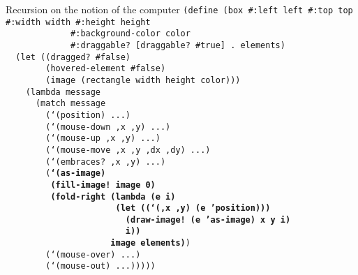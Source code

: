 \begin{frame}{Recursion on the notion of the computer}
  \tiny
  \texttt{(define (box \#:left left \#:top top \#:width width \#:height height\\
    \ \ \ \ \ \ \ \ \ \ \ \ \ \#:background-color color\\
    \ \ \ \ \ \ \ \ \ \ \ \ \ \#:draggable? [draggable? \#true] . elements)\\
    \ \ (let ((dragged? \#false)\\
    \ \ \ \ \ \ \ \ (hovered-element \#false)\\
    \ \ \ \ \ \ \ \ (image (rectangle width height color)))\\
    \ \ \ \ (lambda message\\
    \ \ \ \ \ \ (match message\\
    \ \ \ \ \ \ \ \ (`(position) ...)\\
    \ \ \ \ \ \ \ \ (`(mouse-down ,x ,y) ...)\\
    \ \ \ \ \ \ \ \ (`(mouse-up ,x ,y) ...)\\
    \ \ \ \ \ \ \ \ (`(mouse-move ,x ,y ,dx ,dy) ...)\\
    \ \ \ \ \ \ \ \ (`(embraces? ,x ,y) ...)\\
    \ \ \ \ \ \ \ \ (\textbf{`(as-image)\\
      \ \ \ \ \ \ \ \ \ (fill-image!\ image 0)\\
      \ \ \ \ \ \ \ \ \ (fold-right (lambda (e i)\\
      \ \ \ \ \ \ \ \ \ \ \ \ \ \ \ \ \ \ \ \ \ \ (let ((`(,x ,y) (e 'position)))\\
      \ \ \ \ \ \ \ \ \ \ \ \ \ \ \ \ \ \ \ \ \ \ \ \ (draw-image!\ (e 'as-image) x y i)\\
      \ \ \ \ \ \ \ \ \ \ \ \ \ \ \ \ \ \ \ \ \ \ \ \ i))\\
      \ \ \ \ \ \ \ \ \ \ \ \ \ \ \ \ \ \ \ \ \ image elements)})\\
    \ \ \ \ \ \ \ \ (`(mouse-over) ...)\\
    \ \ \ \ \ \ \ \ (`(mouse-out) ...)))))\\
    \ \\
    \ \\
    \ \\
    \ \\
    \ \\
    \ 
  }
\end{frame}


